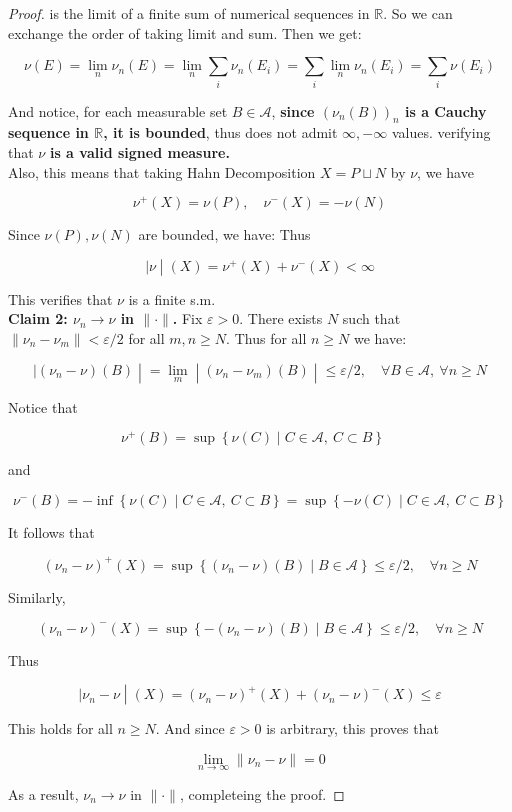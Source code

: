\begin{proof}
is the limit of a finite sum of numerical sequences in \(\mathbb{R}\). So we can exchange the order of taking limit and sum. Then we get:

\[\nu(E) = \lim\limits_{n}\nu_{n}(E) = \lim\limits_{n}\sum\limits_{i}\nu_{n}(E_{i}) = \sum\limits_{i}\lim\limits_{n}\nu_{n}(E_{i}) = \sum\limits_{i}\nu(E_{i})\]

And notice, for each measurable set \(B \in \mathcal{A}\), \textbf{since \((\nu_{n}(B))_{n}\) is a Cauchy sequence in \(\mathbb{R}\), it is bounded}, thus does not admit \(\infty, - \infty\) values. verifying that \(\nu\) \textbf{is a valid signed measure.}\\
Also, this means that taking Hahn Decomposition \(X = P \sqcup N\) by \(\nu\), we have

\[\nu^{+}(X) = \nu(P),\quad\nu^{-}(X) = - \nu(N)\]

Since \(\nu(P),\nu(N)\) are bounded, we have: Thus

\[\left. |\nu \middle| (X) = \nu^{+}(X) + \nu^{-}(X) < \infty \right.\]

This verifies that \(\nu\) is a finite s.m.\\
\textbf{Claim 2: \(\nu_{n}\rightarrow\nu\) in \(\parallel \cdot \parallel\).} Fix \(\varepsilon > 0\). There exists \(N\) such that \(\parallel \nu_{n} - \nu_{m} \parallel < \varepsilon/2\) for all \(m,n \geq N\). Thus for all \(n \geq N\) we have:

\[\left. |(\nu_{n} - \nu)(B) \middle| = \lim\limits_{m} \middle| (\nu_{n} - \nu_{m})(B) \middle| \leq \varepsilon/2,\quad\forall B \in \mathcal{A},\ \forall n \geq N \right.\]

Notice that

\[\nu^{+}(B) = \sup\left\{ {\nu(C) \mid C \in \mathcal{A},\ C \subset B} \right\}\quad\]

and

\[\nu^{-}(B) = - \inf\left\{ {\nu(C) \mid C \in \mathcal{A},\ C \subset B} \right\} = \sup\left\{ {- \nu(C) \mid C \in \mathcal{A},\ C \subset B} \right\}\]

It follows that

\[(\nu_{n} - \nu)^{+}(X) = \sup\left\{ {(\nu_{n} - \nu)(B) \mid B \in \mathcal{A}} \right\} \leq \varepsilon/2,\quad\forall n \geq N\]

Similarly,

\[(\nu_{n} - \nu)^{-}(X) = \sup\left\{ {- (\nu_{n} - \nu)(B) \mid B \in \mathcal{A}} \right\} \leq \varepsilon/2,\quad\forall n \geq N\]

Thus

\[\left. |\nu_{n} - \nu \middle| (X) = (\nu_{n} - \nu)^{+}(X) + (\nu_{n} - \nu)^{-}(X) \leq \varepsilon \right.\]

This holds for all \(n \geq N\). And since \(\varepsilon > 0\) is arbitrary, this proves that

\[\lim\limits_{n\rightarrow\infty} \parallel \nu_{n} - \nu \parallel = 0\]

As a result, \(\nu_{n}\rightarrow\nu\) in \(\parallel \cdot \parallel\), completeing the proof.

\end{proof}

